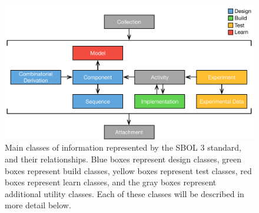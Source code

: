 \begin{figure}[ht]
\begin{center}
\includegraphics[scale=0.85]{images/SBOL3-top-levels.pdf}
\caption{Main classes of information represented by the SBOL 3 standard, and their relationships.  Blue boxes represent design classes, green boxes represent build classes, yellow boxes represent test classes, red boxes represent learn classes, and the gray boxes represent additional utility classes.  Each of these classes will be described in more detail below.}
\label{images:overview2}
\end{center}
\end{figure}
